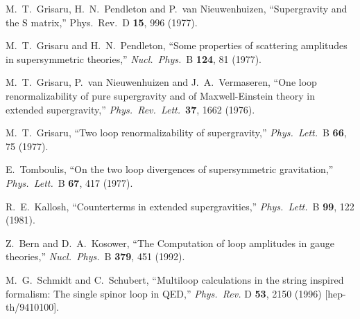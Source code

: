 \begin{thebibliography}{99}
M.~T.~Grisaru, H.~N.~Pendleton and P.~van Nieuwenhuizen,
``Supergravity and the S matrix,''
Phys.\ Rev.\ D {\bf 15}, 996 (1977).

M.~T.~Grisaru and H.~N.~Pendleton,
``Some properties of scattering amplitudes in supersymmetric theories,''
{\it Nucl.\ Phys.}\ B {\bf 124}, 81 (1977).

M.~T.~Grisaru, P.~van Nieuwenhuizen and J.~A.~Vermaseren,
``One loop renormalizability of pure supergravity and of 
Maxwell-Einstein theory in extended supergravity,''
{\it Phys.\ Rev.\ Lett.}\  {\bf 37}, 1662 (1976).

M.~T.~Grisaru,
``Two loop renormalizability of supergravity,''
{\it Phys.\ Lett.}\ B {\bf 66}, 75 (1977).

E.~Tomboulis,
``On the two loop divergences of supersymmetric gravitation,''
{\it Phys.\ Lett.}\ B {\bf 67}, 417 (1977).

R.~E.~Kallosh,
``Counterterms in extended supergravities,''
{\it Phys.\ Lett.}\ B {\bf 99}, 122 (1981).

Z.~Bern and D.~A.~Kosower,
``The Computation of loop amplitudes in gauge theories,''
{\it Nucl.\ Phys.}\ B {\bf 379}, 451 (1992).

M.~G.~Schmidt and C.~Schubert,
``Multiloop calculations in the string inspired formalism: 
The single spinor loop in QED,''
{\it Phys.\ Rev.} D {\bf 53}, 2150 (1996)
[hep-th/9410100].


\end{thebibliography}
